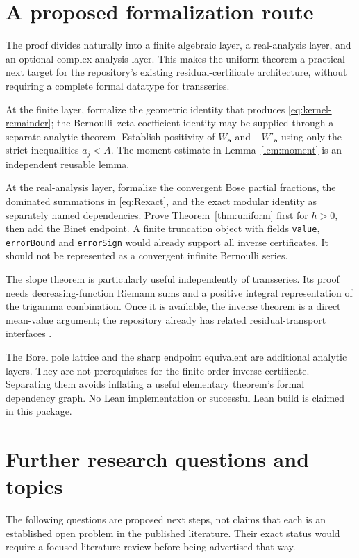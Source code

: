 \documentclass[11pt,a4paper]{article}
\numberwithin{equation}{section}
\theoremstyle{definition}\newtheorem{definition}[theorem]{Definition}
\theoremstyle{remark}\newtheorem{remark}[theorem]{Remark}
\newcommand{\avec}{\boldsymbol a}
\begin{document}
\section{A proposed formalization route}
\label{sec:formalization}

The proof divides naturally into a finite algebraic layer, a real-analysis
layer, and an optional complex-analysis layer. This makes the uniform theorem
a practical next target for the repository's existing residual-certificate
architecture, without requiring a complete formal datatype for transseries.

At the finite layer, formalize the geometric identity that produces
\eqref{eq:kernel-remainder}; the Bernoulli--zeta coefficient identity may be
supplied through a separate analytic theorem. Establish positivity of
$W_{\avec}$ and $-W'_{\avec}$ using only the strict inequalities $a_j<A$.
The moment estimate in Lemma~\ref{lem:moment} is an independent reusable lemma.

At the real-analysis layer, formalize the convergent Bose partial fractions,
the dominated summations in \eqref{eq:Rexact}, and the exact modular identity
as separately named dependencies. Prove Theorem~\ref{thm:uniform} first for
$h>0$, then add the Binet endpoint. A finite truncation object with fields
\texttt{value}, \texttt{errorBound} and \texttt{errorSign} would already support
all inverse certificates. It should not be represented as a convergent
infinite Bernoulli series.

The slope theorem is particularly useful independently of transseries.
Its proof needs decreasing-function Riemann sums and a positive integral
representation of the trigamma combination. Once it is available, the
inverse theorem is a direct mean-value argument; the repository already has
related residual-transport interfaces \cite{repo-readme}.

The Borel pole lattice and the sharp endpoint equivalent are additional
analytic layers. They are not prerequisites for the finite-order inverse
certificate. Separating them avoids inflating a useful elementary theorem's
formal dependency graph. No Lean implementation or successful Lean build is
claimed in this package.

\section{Further research questions and topics}
\label{sec:questions}

The following questions are proposed next steps, not claims that each is an
established open problem in the published literature. Their exact status
would require a focused literature review before being advertised that way.
\end{document}
